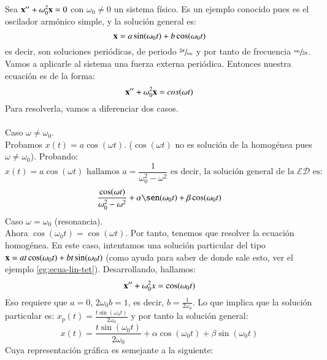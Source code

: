 \begin{eg}
    Sea $\mathbf{x}'' + \omega_0^2 \mathbf{x} = 0$  con $\omega_0 \neq 0$ un sistema físico. Es un ejemplo conocido pues es el oscilador armónico simple, y la solución general es:
    $$
        \mathbf{x} = a \sin(\omega_0 t) + b \cos(\omega_0 t)
    $$
    es decir, son soluciones periódicas, de periodo $\sfrac{2\pi}{\omega_0}$ y por tanto de frecuencia $\sfrac{\omega_0}{2\pi}$.
    Vamos a aplicarle al sistema una fuerza externa periódica. Entonces nuestra ecuación es de la forma:
    $$
        \mathbf{x}'' + \omega_0^2 \mathbf{x} = cos(\omega t)
    $$
    Para resolverla, vamos a diferenciar dos casos.\\\\
    Caso $\omega \neq \omega_0$.\\Probamos $x(t) = a\cos(\omega t)$. ($\cos(\omega t)$ no es solución de la homogénea pues $\omega \neq \omega_0$).
    Probando:
    $$
        x(t) = a\cos(\omega t) \text{ hallamos } a = \frac{1}{\omega_0^2 - \omega^2} \text{ es decir, la solución general de la } \mathcal{ED} \text{ es:}
    $$
    $$
        \frac{\cos(\omega t)}{\omega_0^2 - \omega^2} + \alpha \sen(\omega_0 t) + \beta\cos(\omega_0 t)
    $$
    Caso $\omega = \omega_0$ (resonancia).\\
    Ahora $\cos(\omega_0 t) = \cos(\omega t)$. Por tanto, tenemos que resolver la ecuación homogénea. En este caso, intentamos una solución particular del tipo $\mathbf{x} = a t \cos(\omega_0 t) + b t \sin(\omega_0 t)$ (como ayuda para saber de donde sale esto, ver el ejemplo \ref{eg:ecua-lin-tet}). Desarrollando, hallamos:
    $$
        \mathbf{x}'' + \omega_0^2 x = \cos(\omega_0 t)
    $$
    Eso requiere que $a = 0$, $2\omega_0 b = 1$, es decir, $b = \frac{1}{2 \omega_0}$. Lo que implica que la solución particular es: $x_p(t) = \frac{t \sin(\omega_0 t)}{2 \omega_0}$ y por tanto la solución general:
    $$
        x(t) = \frac{t \sin(\omega_0 t)}{2 \omega_0} + \alpha \cos(\omega_0 t) + \beta \sin(\omega_0 t)
    $$
    Cuya representación gráfica es semejante a la siguiente:
    \begin{center}
    \end{center}
\end{eg}
